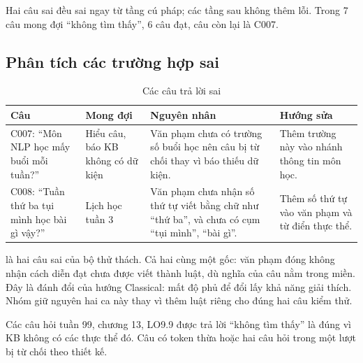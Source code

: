 Hai câu sai đều sai ngay từ tầng cú pháp; các tầng sau không thêm lỗi. Trong 7 câu mong đợi
``không tìm thấy'', 6 câu đạt, câu còn lại là C007.

\subsection{Phân tích các trường hợp sai}

\begin{table}[htbp]
  \centering
  \small
  \begin{tabularx}{\linewidth}{|P{3.5cm}|P{3cm}|L|L|}
    \hline
    \textbf{Câu} & \textbf{Mong đợi} & \textbf{Nguyên nhân} & \textbf{Hướng sửa} \\ \hline
    C007: ``Môn NLP học mấy buổi mỗi tuần?'' & Hiểu câu, báo KB không có dữ kiện &
      Văn phạm chưa có trường số buổi học nên câu bị từ chối thay vì báo thiếu dữ kiện. &
      Thêm trường này vào nhánh thông tin môn học. \\ \hline
    C008: ``Tuần thứ ba tụi mình học bài gì vậy?'' & Lịch học tuần 3 &
      Văn phạm chưa nhận số thứ tự viết bằng chữ như ``thứ ba'', và chưa có cụm ``tụi
      mình'', ``bài gì''. & Thêm số thứ tự vào văn phạm và từ điển thực thể. \\ \hline
  \end{tabularx}
  \caption{Các câu trả lời sai}
  \label{tab:errors}
\end{table}

 là hai câu sai của bộ thử thách. Cả hai cùng một gốc: văn phạm đóng không nhận cách diễn đạt chưa được viết thành luật,
dù nghĩa của câu nằm trong miền. Đây là đánh đổi của hướng Classical: mất độ phủ để đổi lấy
khả năng giải thích. Nhóm giữ nguyên hai ca này thay vì thêm luật riêng cho đúng hai câu
kiểm thử.

Các câu hỏi tuần 99, chương 13, LO9.9 được trả lời ``không tìm thấy'' là đúng vì KB không có
các thực thể đó. Câu có token thừa hoặc hai câu hỏi trong một lượt bị từ chối theo thiết kế.